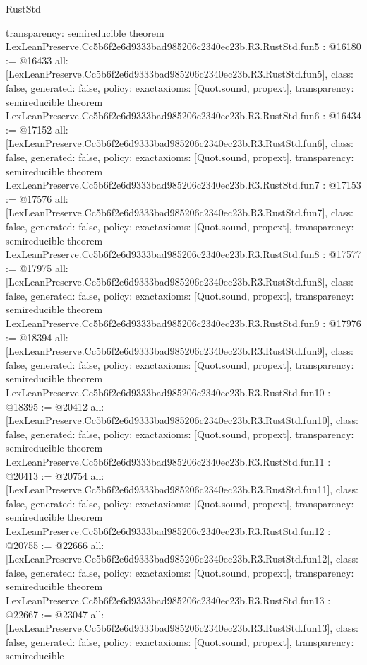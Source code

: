 \begin{lexlean}{RustStd}
\begin{coremodule}
{  transparency: semireducible
}
theorem LexLeanPreserve.Cc5b6f2e6d9333bad985206c2340ec23b.R3.RustStd.fun5 : @16180 := @16433 {
  all: [LexLeanPreserve.Cc5b6f2e6d9333bad985206c2340ec23b.R3.RustStd.fun5],
  class: false,
  generated: false,
  policy: exact{axioms: [Quot.sound, propext]},
  transparency: semireducible
}
theorem LexLeanPreserve.Cc5b6f2e6d9333bad985206c2340ec23b.R3.RustStd.fun6 : @16434 := @17152 {
  all: [LexLeanPreserve.Cc5b6f2e6d9333bad985206c2340ec23b.R3.RustStd.fun6],
  class: false,
  generated: false,
  policy: exact{axioms: [Quot.sound, propext]},
  transparency: semireducible
}
theorem LexLeanPreserve.Cc5b6f2e6d9333bad985206c2340ec23b.R3.RustStd.fun7 : @17153 := @17576 {
  all: [LexLeanPreserve.Cc5b6f2e6d9333bad985206c2340ec23b.R3.RustStd.fun7],
  class: false,
  generated: false,
  policy: exact{axioms: [Quot.sound, propext]},
  transparency: semireducible
}
theorem LexLeanPreserve.Cc5b6f2e6d9333bad985206c2340ec23b.R3.RustStd.fun8 : @17577 := @17975 {
  all: [LexLeanPreserve.Cc5b6f2e6d9333bad985206c2340ec23b.R3.RustStd.fun8],
  class: false,
  generated: false,
  policy: exact{axioms: [Quot.sound, propext]},
  transparency: semireducible
}
theorem LexLeanPreserve.Cc5b6f2e6d9333bad985206c2340ec23b.R3.RustStd.fun9 : @17976 := @18394 {
  all: [LexLeanPreserve.Cc5b6f2e6d9333bad985206c2340ec23b.R3.RustStd.fun9],
  class: false,
  generated: false,
  policy: exact{axioms: [Quot.sound, propext]},
  transparency: semireducible
}
theorem LexLeanPreserve.Cc5b6f2e6d9333bad985206c2340ec23b.R3.RustStd.fun10 : @18395 := @20412 {
  all: [LexLeanPreserve.Cc5b6f2e6d9333bad985206c2340ec23b.R3.RustStd.fun10],
  class: false,
  generated: false,
  policy: exact{axioms: [Quot.sound, propext]},
  transparency: semireducible
}
theorem LexLeanPreserve.Cc5b6f2e6d9333bad985206c2340ec23b.R3.RustStd.fun11 : @20413 := @20754 {
  all: [LexLeanPreserve.Cc5b6f2e6d9333bad985206c2340ec23b.R3.RustStd.fun11],
  class: false,
  generated: false,
  policy: exact{axioms: [Quot.sound, propext]},
  transparency: semireducible
}
theorem LexLeanPreserve.Cc5b6f2e6d9333bad985206c2340ec23b.R3.RustStd.fun12 : @20755 := @22666 {
  all: [LexLeanPreserve.Cc5b6f2e6d9333bad985206c2340ec23b.R3.RustStd.fun12],
  class: false,
  generated: false,
  policy: exact{axioms: [Quot.sound, propext]},
  transparency: semireducible
}
theorem LexLeanPreserve.Cc5b6f2e6d9333bad985206c2340ec23b.R3.RustStd.fun13 : @22667 := @23047 {
  all: [LexLeanPreserve.Cc5b6f2e6d9333bad985206c2340ec23b.R3.RustStd.fun13],
  class: false,
  generated: false,
  policy: exact{axioms: [Quot.sound, propext]},
  transparency: semireducible
}
\end{coremodule}
\end{lexlean}
